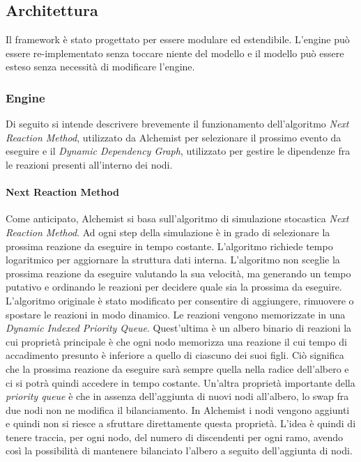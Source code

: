 \documentclass[12pt,a4paper,openright,twoside]{book}
\begin{document}
\subsection{Architettura}
Il framework è stato progettato per essere modulare ed estendibile. L'engine può essere re-implementato senza toccare niente del modello e il modello può essere esteso senza necessità di modificare l'engine. 

\subsubsection{Engine}
Di seguito si intende descrivere brevemente il funzionamento dell'algoritmo \textit{Next Reaction Method}, utilizzato da Alchemist per selezionare il prossimo evento da eseguire e il \textit{Dynamic Dependency Graph}, utilizzato per gestire le dipendenze fra le reazioni presenti all'interno dei nodi. 
\paragraph{Next Reaction Method}
\label{sec:next-reaction-method}
Come anticipato, Alchemist si basa sull'algoritmo di simulazione stocastica \textit{Next Reaction Method}. Ad ogni step della simulazione è in grado di selezionare la prossima reazione da eseguire in tempo costante. L'algoritmo richiede tempo logaritmico per aggiornare la struttura dati interna. L'algoritmo non sceglie la prossima reazione da eseguire valutando la sua velocità, ma generando un tempo putativo e ordinando le reazioni per decidere quale sia la prossima da eseguire. L'algoritmo originale è stato modificato per consentire di aggiungere, rimuovere o spostare le reazioni in modo dinamico. 
Le reazioni vengono memorizzate in una \textit{Dynamic Indexed Priority Queue}. Quest'ultima è un albero binario di reazioni la cui proprietà principale è che ogni nodo memorizza una reazione il cui tempo di accadimento presunto è inferiore a quello di ciascuno dei suoi figli. Ciò significa che la prossima reazione da eseguire sarà sempre quella nella radice dell'albero e ci si potrà quindi accedere in tempo costante. 
Un'altra proprietà importante della \textit{priority queue} è che in assenza dell'aggiunta di nuovi nodi all'albero, lo swap fra due nodi non ne modifica il bilanciamento. 
In Alchemist i nodi vengono aggiunti e quindi non si riesce a sfruttare direttamente questa proprietà. L'idea è quindi di tenere traccia, per ogni nodo, del numero di discendenti per ogni ramo, avendo così la possibilità di mantenere bilanciato l'albero a seguito dell'aggiunta di nodi. 
\end{document}
